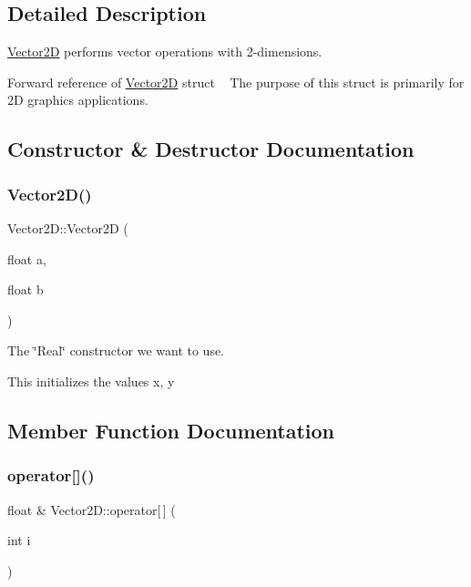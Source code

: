 \subsection{Detailed Description}
\mbox{\hyperlink{struct_vector2_d}{Vector2D}} performs vector operations with 2-\/dimensions. 

Forward reference of \mbox{\hyperlink{struct_vector2_d}{Vector2D}} struct ~\newline
The purpose of this struct is primarily for 2D graphics applications. 

\subsection{Constructor \& Destructor Documentation}
\mbox{\label{struct_vector2_d_ab34332f542a2eef92e4a52548f753587}} 
\subsubsection{\texorpdfstring{Vector2\+D()}{Vector2D()}}
{\footnotesize\ttfamily Vector2\+D\+::\+Vector2D (\begin{DoxyParamCaption}\item[{float}]{a,  }\item[{float}]{b }\end{DoxyParamCaption})}



The \char`\"{}\+Real\char`\"{} constructor we want to use. 

This initializes the values x, y 

\subsection{Member Function Documentation}
\mbox{\label{struct_vector2_d_a27095684e7731a0ebbf2db95e257b9fc}} 
\subsubsection{\texorpdfstring{operator[]()}{operator[]()}\hspace{0.1cm}{\footnotesize\ttfamily [1/2]}}
{\footnotesize\ttfamily float \& Vector2\+D\+::operator\mbox{[}$\,$\mbox{]} (\begin{DoxyParamCaption}\item[{int}]{i }\end{DoxyParamCaption})}



